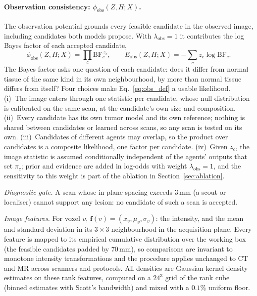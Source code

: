 \documentclass[fleqn,10pt]{olplainarticle}
\begin{document}
\paragraph{Observation consistency: $\phi_{\mathrm{obs}}(Z,H;X)$.}
The observation potential grounds every feasible candidate in the observed image, including candidates both models
propose. With $\lambda_{\mathrm{obs}}=1$ it contributes the log Bayes factor of each accepted candidate,
\begin{equation}
\label{eq:obs_def}
\phi_{\mathrm{obs}}(Z,H;X)=\prod_{c}\mathrm{BF}_c^{\,z_c},\qquad
E_{\mathrm{obs}}(Z,H;X)=-\sum_{c} z_c\log\mathrm{BF}_c .
\end{equation}
The Bayes factor asks one question of each candidate: does it differ from normal tissue of the same kind in its own
neighbourhood, by more than normal tissue differs from itself? Four choices make Eq.~\eqref{eq:obs_def} a usable
likelihood. (i)~The image enters through one statistic per candidate, whose null distribution is calibrated on the same
scan, at the candidate's own size and composition. (ii)~Every candidate has its own tumor model and its own reference;
nothing is shared between candidates or learned across scans, so any scan is tested on its own. (iii)~Candidates of
different agents may overlap, so the product over candidates is a composite likelihood, one factor per candidate.
(iv)~Given $z_c$, the image statistic is assumed conditionally independent of the agents' outputs that set $\pi_c$; prior
and evidence are added in log-odds with weight $\lambda_{\mathrm{obs}}=1$, and the sensitivity to this weight is part of the
ablation in Section~\ref{sec:ablation}.

\textit{Diagnostic gate.} A scan whose in-plane spacing exceeds $3$\,mm (a scout or localiser) cannot support any lesion:
no candidate of such a scan is accepted.

\textit{Image features.} For voxel $v$, $\mathbf{f}(v)=(x_v,\mu_v,\sigma_v)$: the intensity, and the mean and standard
deviation in its $3\times3$ neighbourhood in the acquisition plane. Every feature is mapped to its empirical cumulative
distribution over the working box (the feasible candidates padded by $70$\,mm), so comparisons are invariant to monotone
intensity transformations and the procedure applies unchanged to CT and MR across scanners and protocols. All densities
are Gaussian kernel density estimates on these rank features, computed on a $24^3$ grid of the rank cube (binned
estimates with Scott's bandwidth) and mixed with a $0.1\%$ uniform floor.
\end{document}

